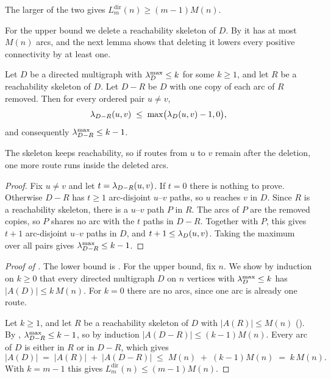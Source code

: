 The larger of the two gives $L_m^{\mathrm{dir}}(n) \ge (m-1)M(n)$.



For the upper bound we delete a reachability skeleton of $D$.
By  it has at most $M(n)$ arcs, and the next lemma shows that deleting it lowers every positive connectivity by at least one.


\begin{lemma}\label{lem:reach-delete}
Let $D$ be a directed multigraph with $\lambda^{\max}_D \le k$ for some $k \ge 1$, and let $R$ be a reachability skeleton of $D$. Let $D - R$ be $D$ with one copy of each arc of $R$ removed. Then for every ordered pair $u \ne v$,
\[
    \lambda_{D-R}(u,v) \;\le\; \max\bigl(\lambda_D(u,v)-1,0\bigr),
\]
and consequently $\lambda^{\max}_{D-R} \le k - 1$.
\end{lemma}

The skeleton keeps reachability, so if routes from $u$ to $v$ remain after the deletion, one more route runs inside the deleted arcs.

\begin{proof}
Fix $u \ne v$ and let $t = \lambda_{D-R}(u,v)$. If $t = 0$ there is nothing to prove.
Otherwise $D-R$ has $t \ge 1$ arc-disjoint $u$--$v$ paths, so $u$ reaches $v$ in $D$.
Since $R$ is a reachability skeleton, there is a $u$--$v$ path $P$ in $R$.
The arcs of $P$ are the removed copies, so $P$ shares no arc with the $t$ paths in $D-R$.
Together with $P$, this gives $t+1$ arc-disjoint $u$--$v$ paths in $D$, and $t + 1 \le \lambda_D(u,v)$.
Taking the maximum over all pairs gives $\lambda^{\max}_{D-R} \le k-1$.
\end{proof}

\begin{proof}[Proof of ]
The lower bound is .
For the upper bound, fix $n$. We show by induction on $k \ge 0$ that every directed multigraph $D$ on $n$ vertices with $\lambda^{\max}_D \le k$ has $|A(D)| \le k\,M(n)$.
For $k=0$ there are no arcs, since one arc is already one route.

Let $k \ge 1$, and let $R$ be a reachability skeleton of $D$ with $|A(R)| \le M(n)$ ().
By , $\lambda^{\max}_{D-R} \le k-1$, so by induction $|A(D-R)| \le (k-1)M(n)$.
Every arc of $D$ is either in $R$ or in $D-R$, which gives
\[
    |A(D)| \;=\; |A(R)| \;+\; |A(D-R)| \;\le\; M(n) \;+\; (k-1)M(n) \;=\; k\,M(n).
\]
With $k = m-1$ this gives $L_m^{\mathrm{dir}}(n) \le (m-1)M(n)$.
\end{proof}

